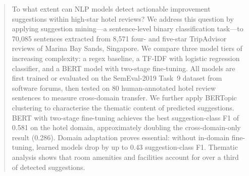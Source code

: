 \begin{abstract}
To what extent can NLP models detect actionable improvement
suggestions within high-star hotel reviews? We address this
question by applying suggestion mining---a sentence-level binary
classification task---to 70,085 sentences extracted from 8,571
four- and five-star TripAdvisor reviews of Marina Bay Sands,
Singapore. We compare three model tiers of increasing complexity:
a regex baseline, a TF-IDF with logistic regression classifier,
and a BERT model with two-stage fine-tuning. All models are first
trained or evaluated on the SemEval-2019 Task~9 dataset from
software forums, then tested on 80 human-annotated hotel review
sentences to measure cross-domain transfer. We further apply
BERTopic clustering to characterise the thematic content of
predicted suggestions. BERT with two-stage fine-tuning achieves
the best suggestion-class F1 of 0.581 on the hotel domain,
approximately doubling the cross-domain-only result (0.286).
Domain adaptation proves essential: without in-domain fine-tuning,
learned models drop by up to 0.43 suggestion-class F1. Thematic
analysis shows that room amenities
and facilities account for over a third of detected suggestions.
\end{abstract}
